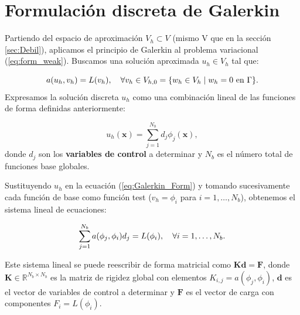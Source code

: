 \documentclass[11pt]{book}
\theoremstyle{plain} %
\theoremstyle{definition} %
\theoremstyle{definition} %
\begin{document}
\section{Formulación discreta de Galerkin}
\vspace{-0.2cm}

Partiendo del espacio de aproximación $V_h \subset V$ (mismo V que en la sección \ref{sec:Debil}), aplicamos el principio de Galerkin al problema variacional (\ref{eq:form_weak}). Buscamos una solución aproximada $u_h \in V_h$ tal que:
\vspace{-0.7cm}

\begin{equation} \label{eq:Galerkin_Form}
    \vspace{-0.06cm}
    a(u_h, v_h) = L(v_h), \quad \forall v_h \in V_{h,0}=\{w_h \in V_h \mid w_h=0 \text{ en } \Gamma\}.
\end{equation}
Expresamos la solución discreta $u_h$ como una combinación lineal de las funciones de forma definidas anteriormente:

\vspace{-0.7cm}
\begin{equation*}
    u_h(\mathbf{x}) = \sum_{j=1}^{N_b} d_j \phi_j(\mathbf{x}),
\end{equation*}
donde $d_j$ son los \textbf{variables de control} a determinar y $N_b$ es el número total de funciones base globales.

Sustituyendo $u_h$ en la ecuación (\ref{eq:Galerkin_Form}) y tomando sucesivamente cada función de base como función test ($v_h = \phi_i$ para $i=1,\dots,N_b$), obtenemos el sistema lineal de ecuaciones:

\vspace{-0.3cm}
\begin{equation*}
    \vspace{-0.1cm}
    \sum_{j=1}^{N_b} a(\phi_j, \phi_i) d_j = L(\phi_i), \quad \forall i=1,\dots,N_b.
\end{equation*}

Este sistema lineal se puede reescribir de forma matricial como $\mathbf{K} \mathbf{d} = \mathbf{F}$,
donde $\mathbf{K}\in \mathbb{R}^{N_b \times N_b}$ es la matriz de rigidez global con elementos $K_{i,j} = a(\phi_j, \phi_i)$, $\mathbf{d}$ es el vector de variables de control a determinar y $\mathbf{F}$ es el vector de carga con componentes $F_i = L(\phi_i)$.

\vspace{-0.15cm}
\end{document}
